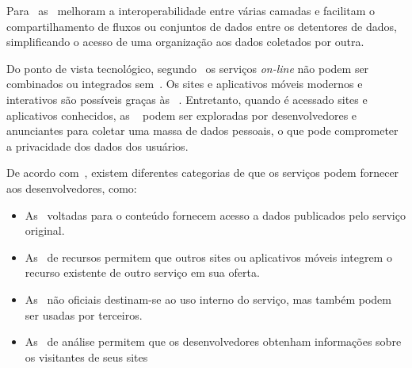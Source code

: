 Para~\textcite{borgogno2019} as~ melhoram a
interoperabilidade entre várias camadas e facilitam o compartilhamento de
fluxos ou conjuntos de dados entre os detentores de dados, simplificando o
acesso de uma organização aos dados coletados por outra.

Do ponto de vista tecnológico, segundo~\textcite{russel2019} os serviços
\textit{on-line} não podem ser combinados ou integrados sem~.
Os sites e aplicativos móveis modernos e interativos são possíveis graças às
~.
Entretanto, quando é acessado sites e aplicativos conhecidos, as
~ podem ser exploradas por desenvolvedores e anunciantes para
coletar uma massa de dados pessoais, o que pode comprometer a privacidade dos
dados dos usuários.

De acordo com~\textcite{russel2019}, existem diferentes categorias de
 que os serviços podem fornecer aos desenvolvedores, como:

\begin{itemize}
    \item As~ voltadas para o conteúdo fornecem acesso a
    dados publicados pelo serviço original.
    \item As~ de recursos permitem que outros sites ou
    aplicativos móveis integrem o recurso existente de outro serviço em sua
    oferta.
    \item As~ não oficiais destinam-se ao uso interno do
    serviço, mas também podem ser usadas por terceiros.
    \item As~ de análise permitem que os desenvolvedores
    obtenham informações sobre os visitantes de seus sites
\end{itemize}

